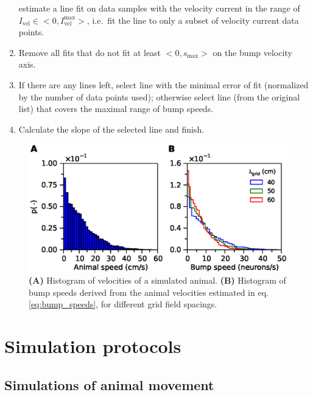 \documentclass[a4paper,12pt]{article}
\begin{document}
\begin{enumerate}
        estimate a line fit on data samples with the velocity current in the
        range of $I_{\text{vel}} \in <0, I_{\text{vel}}^{\text{max}}>$, i.e.\ 
        fit the line to only a subset of velocity current data points.
    \item Remove all fits that do not fit at least $<0, s_{\text{max}}>$ on the
        bump velocity axis.
    \item If there are any lines left, select line with the minimal error
        of fit (normalized by the number of data points used); otherwise select
        line (from the original list) that covers the maximal range of bump
        speeds.
    \item Calculate the slope of the selected line and finish.
\end{enumerate}

\renewcommand{\figurename}{Supplementary Methods Figure}
\begin{figure}[th]
    \begin{center}
        \includegraphics{fig/velocity_histograms}
    \end{center}
    \caption{\textbf{(A)} Histogram of velocities of a simulated animal.
    \textbf{(B)} Histogram of bump speeds derived from the animal velocities
    estimated in eq. \eqref{eq:bump_speeds}, for different grid field spacings.}
    \label{fig:velocity_histograms}
\end{figure}


\section{Simulation protocols} \label{sec:noise_protocols}

\subsection{Simulations of animal movement} \label{sec:noise_grids_protocol}
\end{document}
